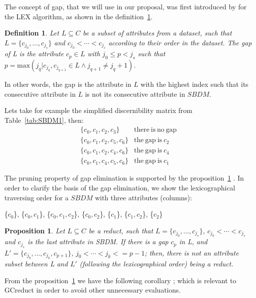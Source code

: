 \documentclass[authoryear,preprint,review,12pt]{elsarticle}
\newtheorem{proposition}{Proposition}
\newtheorem{definition}{Definition}
\begin{document}
	The concept of gap, that we will use in our proposal, was first introduced by \cite{Santiesteban03} for 
	the LEX algorithm, as shown in the definition~\ref{def:gap}.
	
	\begin{definition}\label{def:gap}
		Let $L \subseteq C$ be a subset of attributes from a dataset, such that $L = \lbrace c_{j_0},...,c_{j_s}
		\rbrace$ and $c_{j_0}<\cdots <c_{j_s}$ according to their order in the dataset. The gap of L is the
		attribute $c_p \in L$ with $j_0 \leq p <	j_s$ such that $p=\mathrm{max}(j_q | c_{j_q},c_{j_{q+1}} \in 
		L \wedge j_{q+1} \neq j_q+1)$.
	\end{definition}
	
	In other words, the gap is the attribute in $L$ with the highest index such that its consecutive attribute in $L$ is not its consecutive attribute in $SBDM$.
	
	Lets take for example the simplified discernibility matrix from Table~\ref{tab:SBDM1}, then:
	$$\begin{array}{ll}
	\lbrace c_0,c_1,c_2,c_3\rbrace 		& \mathrm{there~is~no~gap}\\
	\lbrace c_0,c_1,c_2,c_5,c_6\rbrace 	& \mathrm{the~gap~is~} c_2\\
	\lbrace c_0,c_1,c_2,c_4,c_6\rbrace 	& \mathrm{the~gap~is~} c_4\\
	\lbrace c_0,c_1,c_4,c_5,c_6\rbrace 	& \mathrm{the~gap~is~} c_1
	\end{array}$$


	The pruning property of gap elimination is supported by the proposition~\ref{prop:gap} \citep{Santiesteban03}. In order to clarify	the basis of the gap elimination, we show the lexicographical traversing order for a $SBDM$ with three attributes (columns):
	
	\{$c_0$\}, \{$c_0,c_1$\}, \{$c_0,c_1,c_2$\}, \{$c_0,c_2$\}, \{$c_1$\}, \{$c_1,c_2$\}, \{$c_2$\}
		
	\begin{proposition}\label{prop:gap} 
		Let $L \subseteq C$ be a reduct, such that $L = \lbrace c_{j_0},...,c_{j_s}\rbrace$, $c_{j_0}<\cdots
		<c_{j_s}$ and $c_{j_s}$ is the last attribute in SBDM. If there is a gap $c_p$ in L, and $L' = \lbrace
		c_{j_0},...,c_{j_k},c_{p+1}\rbrace$, $j_0<\cdots <j_k<=p-1$; then, there is not an attribute subset
		between L and $L'$ (following the lexicographical order) being a reduct.
	\end{proposition}	
	
	From the proposition~\ref{prop:gap} we have the following corollary \citep{Santiesteban03}; which is relevant to GCreduct in order to avoid other unnecessary evaluations.
	
\end{document}
